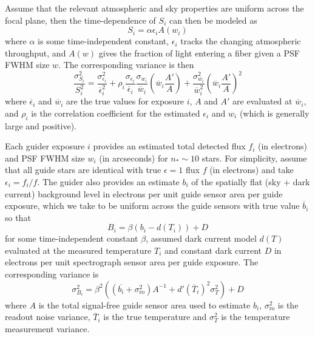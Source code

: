 \documentclass[11pt]{article}
\begin{document}
Assume that the relevant atmospheric and sky properties are uniform across the focal plane, then the time-dependence of $S_i$ can then be modeled as
\begin{equation}
S_i = \alpha \epsilon_i A(w_i)
\end{equation}
where $\alpha$ is some time-independent constant, $\epsilon_i$ tracks the changing atmospheric throughput, and $A(w)$ gives the fraction of light entering a fiber given a PSF FWHM size $w$. The corresponding variance is then
\begin{equation}
\frac{\sigma_{S_i}^2}{S_i^2} =
\frac{\sigma_{\epsilon_i}^2}{\overline{\epsilon}_i^2} +
\rho_i\frac{\sigma_{\epsilon_i}}{\overline{\epsilon}_i}\frac{\sigma_{w_i}}{\overline{w}_i} \left( \overline{w}_i\frac{A'}{A}\right) +
\frac{\sigma_{w_i}^2}{\overline{w}_i^2} \left( \overline{w}_i\frac{A'}{A}\right)^2
\label{eqn:sig-error}
\end{equation}
where $\overline{\epsilon}_i$ and $\overline{w}_i$ are the true values for exposure $i$, $A$ and $A'$ are evaluated at $\overline{w}_i$, and $\rho_i$ is the correlation coefficient for the estimated $\epsilon_i$ and $w_i$ (which is generally large and positive).

Each guider exposure $i$ provides an estimated total detected flux $f_i$ (in electrons) and PSF FWHM size $w_i$ (in arcseconds) for $n_\ast \sim 10$ stars.  For simplicity, assume that all guide stars are identical with true $\epsilon = 1$ flux $f$ (in electrons) and take $\epsilon_i = f_i/f$. The guider also provides an estimate $b_i$ of the spatially flat (sky + dark current) background level in electrons per unit guide sensor area per guide exposure, which we take to be uniform across the guide sensors with true value $\overline{b}_i$ so that
\begin{equation}
B_i = \beta (b_i - d(T_i)) + D
\end{equation}
for some time-independent constant $\beta$, assumed dark current model $d(T)$ evaluated at the measured temperature $T_i$ and constant dark current $D$ in electrons per unit spectrograph sensor area per guide exposure. The corresponding variance is
\begin{equation}
\sigma_{B_i}^2 = \beta^2\left((\overline{b_i}  + \sigma_{\text{ro}}^2)A^{-1} + d'(\overline{T}_i)^2 \sigma_T^2\right) + D
\end{equation}
where $A$ is the total signal-free guide sensor area used to estimate $b_i$, $\sigma_{\text{ro}}^2$ is the readout noise variance, $\overline{T}_i$ is the true temperature and $\sigma_T^2$ is the temperature measurement variance.
\end{document}
